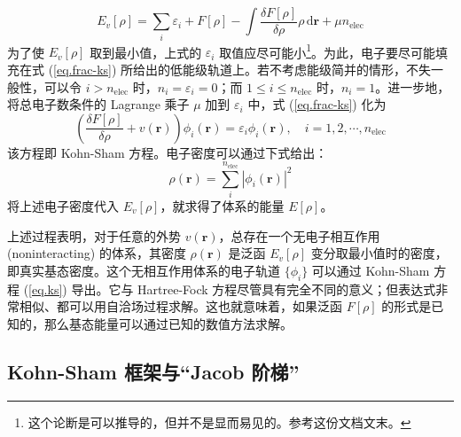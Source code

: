 \begin{equation}
  \label{eq.frac-ks-eng}
  E_v[\rho] = \sum_i \varepsilon_i + F[\rho] - \int \frac{\delta F[\rho]}{\delta \rho} \rho \, \mathrm{d} \bm{r} + \mu n_\mathrm{elec}
\end{equation}
为了使 $E_v[\rho]$ 取到最小值，上式的 $\varepsilon_i$ 取值应尽可能小\footnote{这个论断是可以推导的，但并不是显而易见的。参考这份文档文末。}。为此，电子要尽可能填充在式 (\ref{eq.frac-ks}) 所给出的低能级轨道上。若不考虑能级简并的情形，不失一般性，可以令 $i > n_\mathrm{elec}$ 时，$n_i = \varepsilon_i = 0$；而 $1 \leqslant i \leqslant n_\mathrm{elec}$ 时，$n_i = 1$。进一步地，将总电子数条件的 Lagrange 乘子 $\mu$ 加到 $\varepsilon_i$ 中，式 (\ref{eq.frac-ks}) 化为
\begin{equation}
  \label{eq.ks}
  \left( \frac{\delta F[\rho]}{\delta \rho} + v(\bm{r}) \right) \phi_i (\bm{r}) = \varepsilon_i \phi_i (\bm{r}), \quad i = 1, 2, \cdots, n_\mathrm{elec}
\end{equation}
该方程即 Kohn-Sham 方程。电子密度可以通过下式给出：
\begin{equation}
  \rho(\bm{r}) = \sum_i^{n_\mathrm{elec}} |\phi_i(\bm{r})|^2
\end{equation}
将上述电子密度代入 $E_v[\rho]$，就求得了体系的能量 $E[\rho]$。

上述过程表明，对于任意的外势 $v(\bm{r})$，总存在一个无电子相互作用 (noninteracting) 的体系，其密度 $\rho(\bm{r})$ 是泛函 $E_v[\rho]$ 变分取最小值时的密度，即真实基态密度。这个无相互作用体系的电子轨道 $\{\phi_i\}$ 可以通过 Kohn-Sham 方程 (\ref{eq.ks}) 导出。它与 Hartree-Fock 方程尽管具有完全不同的意义；但表达式非常相似、都可以用自洽场过程求解。这也就意味着，如果泛函 $F[\rho]$ 的形式是已知的，那么基态能量可以通过已知的数值方法求解。

\subsection{Kohn-Sham 框架与“Jacob 阶梯”}

